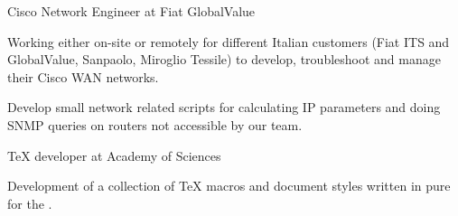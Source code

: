 %

%


   {Cisco Network Engineer at Fiat GlobalValue}

Working either on-site or remotely for different Italian customers (Fiat ITS
and GlobalValue, Sanpaolo, Miroglio Tessile) to develop, troubleshoot and
manage their Cisco WAN networks.

Develop small network related scripts for calculating IP parameters and doing
SNMP queries on routers not accessible by our team.

%
   

   {\TeX{} developer at Academy of Sciences}

Development of a collection of \TeX{} macros and document styles %
written in pure \plainTeX{} for the .

